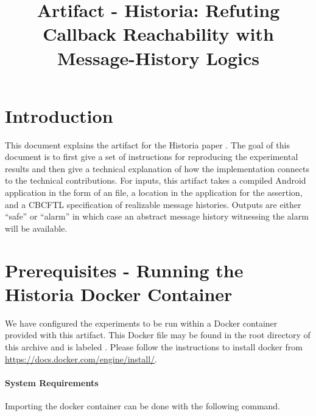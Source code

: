 \documentclass{acmart} %
\begin{document}

\newcommand{\newls}{CBCFTL\xspace}
%
\title{Artifact - Historia: Refuting Callback Reachability with Message-History Logics}

\begin{abstract}
\end{abstract}


\maketitle
%
\section{Introduction}
This document explains the artifact for the Historia paper \cite{conf/oopsla/Meier23}.
The goal of this document is to first give a set of instructions for reproducing the experimental results and then give a technical explanation of how the implementation connects to the technical contributions.
For inputs, this artifact takes a compiled Android application in the form of an  file, a location in the application for the assertion, and a \newls specification of realizable message histories.
Outputs are either ``safe'' or ``alarm'' in which case an abstract message history witnessing the alarm will be available.

\section{Prerequisites - Running the Historia Docker Container}

We have configured the experiments to be run within a Docker container provided with this artifact.
This Docker file may be found in the root directory of this archive and is labeled .  Please follow the instructions to install docker from \url{https://docs.docker.com/engine/install/}.

\paragraph{System Requirements} 


Importing the docker container can be done with the following command.
\end{document}
